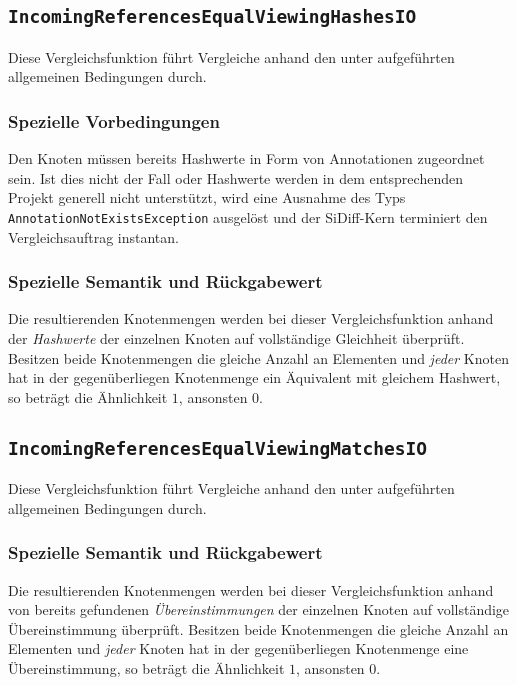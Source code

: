 \subsection{\texttt{IncomingReferencesEqualViewingHashesIO}}
Diese Vergleichsfunktion führt Vergleiche anhand den unter\mylinebreak{} aufgeführten allgemeinen Bedingungen durch.

\subsubsection*{Spezielle Vorbedingungen}
Den Knoten müssen bereits Hashwerte in Form von Annotationen zugeordnet sein. Ist dies nicht der Fall oder Hashwerte werden in dem entsprechenden Projekt generell nicht unterstützt, wird eine Ausnahme des Typs \texttt{AnnotationNotExistsException} ausgelöst und der SiDiff-Kern terminiert den Vergleichsauftrag instantan.

\subsubsection*{Spezielle Semantik und Rückgabewert}
Die resultierenden Knotenmengen werden bei dieser Vergleichsfunktion anhand der \emph{Hashwerte} der einzelnen Knoten auf vollständige Gleichheit überprüft. Besitzen beide Knotenmengen die gleiche Anzahl an Elementen und \emph{jeder} Knoten hat in der gegenüberliegen Knotenmenge ein Äquivalent mit gleichem Hashwert, so beträgt die Ähnlichkeit $1$, ansonsten $0$.


%
%
\subsection{\texttt{IncomingReferencesEqualViewingMatchesIO}}
Diese Vergleichsfunktion führt Vergleiche anhand den unter\mylinebreak{} aufgeführten allgemeinen Bedingungen durch.

\subsubsection*{Spezielle Semantik und Rückgabewert}
Die resultierenden Knotenmengen werden bei dieser Vergleichsfunktion anhand von bereits gefundenen \emph{Übereinstimmungen} der einzelnen Knoten auf vollständige Übereinstimmung überprüft. Besitzen beide Knotenmengen die gleiche Anzahl an Elementen und \emph{jeder} Knoten hat in der gegenüberliegen Knotenmenge eine Übereinstimmung, so beträgt die Ähnlichkeit $1$, ansonsten $0$.

